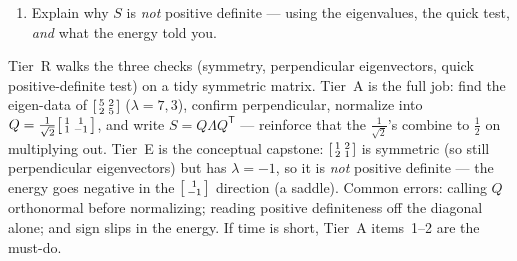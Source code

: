 \documentclass[10pt]{article}
\newcommand{\T}{\mathsf{T}}
\begin{document}
\begin{tcolorbox}[colback=white, colframe=black!40, title=\textbf{Tier E --- Extension},
    fonttitle=\bfseries, arc=1.5mm, left=3mm, right=3mm, top=2mm, bottom=2mm, breakable]
\begin{enumerate}[leftmargin=1.7em, itemsep=9pt]
  \item Explain why $S$ is \emph{not} positive definite --- using the eigenvalues, the quick test, \emph{and}
        what the energy told you. 
\end{enumerate}
\end{tcolorbox}

\begin{teachernote}
Tier~R walks the three checks (symmetry, perpendicular eigenvectors, quick positive-definite test) on a
tidy symmetric matrix. Tier~A is the full job: find the eigen-data of $\begin{bsmallmatrix}5&2\\2&5\end{bsmallmatrix}$
($\lambda=7,3$), confirm perpendicular, normalize into $Q=\frac{1}{\sqrt2}\begin{bsmallmatrix}1&1\\1&-1\end{bsmallmatrix}$,
and write $S=Q\Lambda Q^{\T}$ --- reinforce that the $\frac1{\sqrt2}$'s combine to $\frac12$ on multiplying
out. Tier~E is the conceptual capstone: $\begin{bsmallmatrix}1&2\\2&1\end{bsmallmatrix}$ is symmetric (so
still perpendicular eigenvectors) but has $\lambda=-1$, so it is \emph{not} positive definite --- the energy
goes negative in the $\begin{bsmallmatrix}1\\-1\end{bsmallmatrix}$ direction (a saddle). Common errors:
calling $Q$ orthonormal before normalizing; reading positive definiteness off the diagonal alone; and sign
slips in the energy. If time is short, Tier~A items~1--2 are the must-do.
\end{teachernote}
\end{document}
